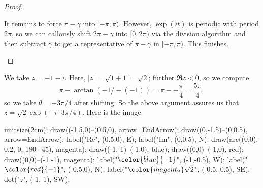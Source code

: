\begin{proof}
\begin{itemize}
		It remains to force $\pi-\gamma$ into $[-\pi,\pi)$. However, $\exp(it)$ is periodic with period $2\pi$, so we can callously shift $2\pi-\gamma$ into $[0,2\pi)$ via the division algorithm and then subtract $\gamma$ to get a representative of $\pi-\gamma$ in $[-\pi,\pi)$. This finishes.
		\qedhere
	\end{itemize}
\end{proof}
\begin{example}
	We take $z=-1-i$. Here, $|z|=\sqrt{1+1}=\sqrt2$; further $\Re z<0$, so we compute
	\[\pi-\arctan(-1/-(-1))=\pi--\frac\pi4=\frac{5\pi}4,\]
	so we take $\theta=-3\pi/4$ after shifting. So the above argument assures us that $z=\sqrt2\exp(-i\cdot3\pi/4)$. Here is the image.
	\begin{center}
		\begin{asy}
			unitsize(2cm);
			draw((-1.5,0)--(0.5,0), arrow=EndArrow);
			draw((0,-1.5)--(0,0.5), arrow=EndArrow);
			label("$\textrm{Re}$", (0.5,0), E);
			label("$\textrm{Im}$", (0,0.5), N);
			draw(arc((0,0), 0.2, 0, 180+45), magenta);
			draw((-1,-1)--(-1,0), blue);
			draw((0,0)--(-1,0), red);
			draw((0,0)--(-1,-1), magenta);
			label("$\color{blue}{-1}$", (-1,-0.5), W);
			label("$\color{red}{-1}$", (-0.5,0), N);
			label("$\color{magenta}\sqrt2$", (-0.5,-0.5), SE);
			dot("$z$", (-1,-1), SW);
		\end{asy}
	\end{center}
\end{example}
